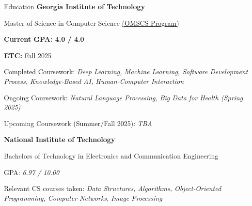 
\begin{rubric}{Education}
\entry*[2023 -- Present]%
	\textbf{Georgia Institute of Technology}\par
    Master of Science in Computer Science \href{https://omscs.gatech.edu}{(OMSCS Program)} \par
	\textbf{Current GPA: 4.0 / 4.0}\par
    \textbf{ETC:} Fall 2025\par
	Completed Coursework: \emph{Deep Learning, Machine Learning, Software Development Process, Knowledge-Based AI, Human-Computer Interaction}\par
	Ongoing Coursework: \emph{Natural Language Processing, Big Data for Health (Spring 2025)}\par
	Upcoming Coursework (Summer/Fall 2025): \emph{TBA}

\entry*[2014 -- 2018]%
	\textbf{National Institute of Technology}\par
    Bachelors of Technology in Electronics and Communication Engineering \par
	GPA: \emph{6.97 / 10.00}\par
	Relevant CS courses taken: \emph{Data Structures, Algorithms, Object-Oriented Programming, Computer Networks, Image Processing}
\end{rubric}